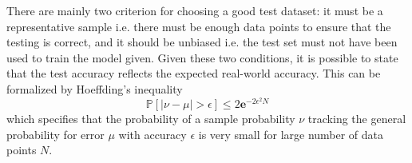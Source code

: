 There are mainly two criterion for choosing a good test dataset: it must be a representative sample i.e. there must be enough data points to ensure that the testing is correct,
and it should be unbiased i.e. the test set must not have been used to train the model given.
Given these two conditions, it is possible to state that the test accuracy reflects the expected real-world accuracy.
This can be formalized by Hoeffding's inequality
$$\mathbb{P}\left[\left|\nu - \mu\right|> \epsilon\right]\leq 2\mathbf{e}^{-2\epsilon^2N}$$
which specifies that the probability of a sample probability $\nu$ tracking the general probability for error $\mu$ with accuracy $\epsilon$ is very small for large
number of data points $N$.
